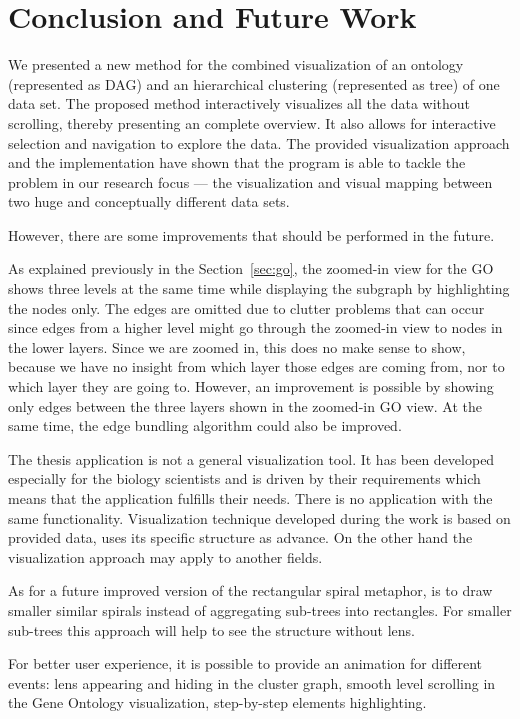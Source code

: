 \newpage
\section{Conclusion and Future Work}
\label{sec:conclusion}

We presented a new method for the combined visualization of an ontology (represented as DAG)
and an hierarchical clustering (represented as tree) of one data set.
The proposed method interactively visualizes all the data without scrolling,
thereby presenting an complete overview.
It also allows for interactive selection and navigation to explore the data.
The provided visualization approach and the implementation have shown that the program is able to tackle the problem in our research focus ---
the visualization and visual mapping between two huge and conceptually different data sets.

However, there are some improvements that should be performed in the future.

As explained previously in the Section~\ref{sec:go}, the zoomed-in view for the GO shows three levels at the same time while displaying the subgraph by highlighting the nodes only.
The edges are omitted due to clutter problems that can occur since edges from a higher level might go through the zoomed-in view to nodes in the lower layers.
Since we are zoomed in, this does no make sense to show, because we have no insight from which layer those edges are coming from, nor to which layer they are going to.
However, an improvement is possible by showing only edges between the three layers shown in the zoomed-in GO view.
At the same time, the edge bundling algorithm could also be improved.

The thesis application is not a general visualization tool.
It has been developed especially for the biology scientists and is driven by their requirements which means that the application fulfills their needs.
There is no application with the same functionality.
Visualization technique developed during the work is based on provided data, uses its specific structure as advance.
On the other hand the visualization approach may apply to another fields.

As for a future improved version of the rectangular spiral metaphor, is to draw smaller similar spirals instead of aggregating sub-trees into rectangles.
For smaller sub-trees this approach will help to see the structure without lens.

For better user experience, it is possible to provide an animation for different events:
lens appearing and hiding in the cluster graph,
smooth level scrolling in the Gene Ontology visualization,
step-by-step elements highlighting.